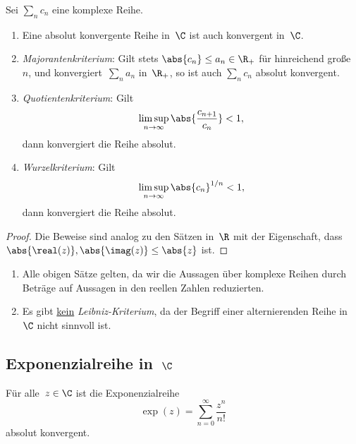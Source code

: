 \documentclass[a4paper]{article}
\begin{document}
\begin{proposition}
    Sei $\sum_n c_n$ eine komplexe Reihe.
    \begin{enumerate}
        \item Eine absolut konvergente Reihe in~$\C$ ist auch konvergent in~$\C$.
        \item \emph{Majorantenkriterium}: Gilt stets $\abs{c_n} \leq a_n \in \R_+$ für hinreichend große~$n$, und konvergiert~$\sum_n a_n$ in~$\R_+$, so ist auch $\sum_n c_n$ absolut konvergent.
        \item \emph{Quotientenkriterium}: Gilt
              \begin{equation*}
                  \limsup_{n\to\infty} \abs{\frac{c_{n+1}}{c_n}} < 1,
              \end{equation*}
              dann konvergiert die Reihe absolut.
        \item \emph{Wurzelkriterium}: Gilt
              \begin{equation*}
                  \limsup_{n\to\infty} \abs{c_n}^{1/n} < 1,
              \end{equation*}
              dann konvergiert die Reihe absolut.
    \end{enumerate}
\end{proposition}

\begin{proof}
    Die Beweise sind analog zu den Sätzen in~$\R$ mit der Eigenschaft, dass $\abs{\real(z)}, \abs{\imag(z)} \leq \abs{z}$ ist.
\end{proof}

\begin{remark}\leavevmode
    \begin{enumerate}
        \item Alle obigen Sätze gelten, da wir die Aussagen über komplexe Reihen durch Beträge auf Aussagen in den reellen Zahlen reduzierten.
        \item Es gibt \underline{kein} \emph{Leibniz-Kriterium}, da der Begriff einer alternierenden Reihe in~$\C$ nicht sinnvoll ist.
    \end{enumerate}
\end{remark}

\subsection{Exponenzialreihe in~\texorpdfstring{$\C$}{C}}

\begin{theorem}
    Für alle~$z \in \C$ ist die Exponenzialreihe
    \begin{equation*}
        \exp(z) = \sum_{n=0}^\infty \frac{z^n}{n!}
    \end{equation*}
    absolut konvergent.
\end{theorem}
\end{document}
